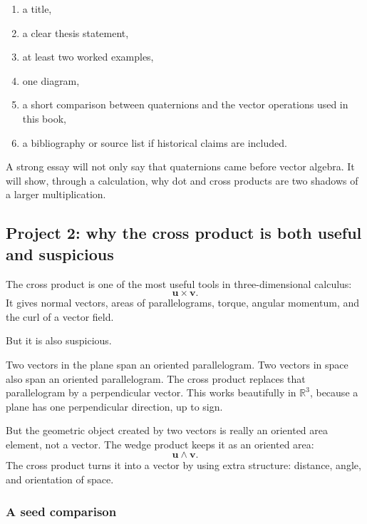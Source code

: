\begin{enumerate}
\item a title,

\item a clear thesis statement,

\item at least two worked examples,

\item one diagram,

\item a short comparison between quaternions and the vector operations used in this
book,

\item a bibliography or source list if historical claims are included.
\end{enumerate}

A strong essay will not only say that quaternions came before vector algebra.  It will
show, through a calculation, why dot and cross products are two shadows of a larger
multiplication.

\subsection{Project 2: why the cross product is both useful and suspicious}

The cross product is one of the most useful tools in three-dimensional calculus:
\[
    \mathbf u\times\mathbf v.
\]
It gives normal vectors, areas of parallelograms, torque, angular momentum, and the
curl of a vector field.

But it is also suspicious.

Two vectors in the plane span an oriented parallelogram.  Two vectors in space also
span an oriented parallelogram.  The cross product replaces that parallelogram by a
perpendicular vector.  This works beautifully in \(\mathbb R^3\), because a plane has one
perpendicular direction, up to sign.

But the geometric object created by two vectors is really an oriented area element, not
a vector.  The wedge product keeps it as an oriented area:
\[
    \mathbf u\wedge\mathbf v.
\]
The cross product turns it into a vector by using extra structure: distance, angle, and
orientation of space.

\subsubsection*{A seed comparison}

